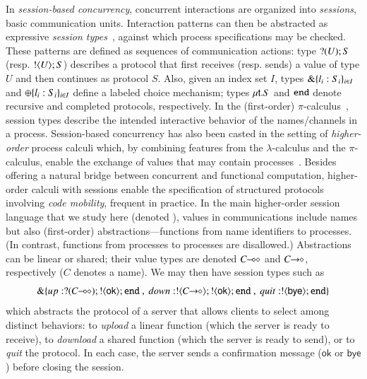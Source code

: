 In \emph{session-based concurrency}, concurrent interactions are organized into \emph{sessions}, basic communication units.
Interaction patterns can then be abstracted as expressive \emph{session types}~\cite{honda.vasconcelos.kubo:language-primitives}, against which process specifications may be checked. 
These patterns are defined as %
sequences of communication actions: %
type $? (U) ; S$ (resp.  $! \langle U \rangle ; S$)
describes a protocol that first receives (resp. sends) a value of type $U$ and then continues as protocol $S$.
Also, given an index set $I$, types $\& \{l_i:S_i\}_{i \in I}$ 
and $\oplus \{l_i:S_i\}_{i \in I}$ 
define %
 a labeled choice mechanism; types 
$\mu\mathsf{t}.S$ 
and 
$\mathtt{end}$ denote recursive and completed protocols, respectively.
In the (first-order) $\pi$-calculus~\cite{MilnerR:calmp1}, 
session types describe the intended interactive behavior of the names/channels in a process.
Session-based concurrency has also been casted in the setting of \emph{higher-order} process
calculi which, by combining features from the $\lambda$-calculus and the $\pi$-calculus, 
enable the exchange of values that may contain processes~\cite{tlca07,DBLP:journals/jfp/GayV10}. 
Besides offering a natural bridge between concurrent and functional computation, 
higher-order calculi with sessions enable the specification of structured protocols involving \emph{code mobility}, 
frequent in practice.
In the main higher-order session language that we study here (denoted \HOp),
 values in communications include names but also (first-order) abstractions---functions from name identifiers to processes. 
 (In contrast, functions from processes to processes are disallowed.)
Abstractions can be linear or shared; their value types are  denoted $C\!\! \multimap\!\! \diamond$ and $C\!\! \rightarrow\!\! \diamond$, respectively ($C$ 
denotes a name). We may then have 
session types such as
$$\btbra{up:\btinp{\lhot{C}}\btout{\mathsf{ok}}\tinact ~ , ~ down:\btout{\shot{C}}\btout{\mathsf{ok}}\tinact ~ , ~quit:\btout{\mathsf{bye}}\tinact}_{}$$
which abstracts the protocol of a server that allows 
  clients to select among distinct  behaviors: %
  to \emph{upload} a linear function (which the server is ready to receive), to \emph{download} a shared function (which the server is ready to send), or to \emph{quit} the protocol.
  In each case, the server sends a confirmation message ($\mathsf{ok}$ or $\mathsf{bye}$) before closing the session.





